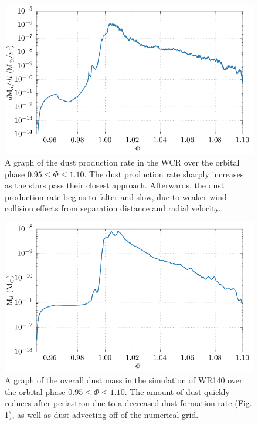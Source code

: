 \documentclass[fleqn,usenatbib]{mnras}
\begin{document}
\begin{figure}
  \centering
  \includegraphics[width=\linewidth]{assets/wr140-dust_rate.pdf}
  \caption{A graph of the dust production rate in the WCR over the orbital phase $0.95 \leq \Phi \leq 1.10$. The dust production rate sharply increases as the stars pass their closest approach. Afterwards, the dust production rate begins to falter and slow, due to weaker wind collision effects from separation distance and radial velocity.}
  \label{fig:wr140-dustproduction}
\end{figure}

\begin{figure}
  \centering
  \includegraphics[width=\linewidth]{assets/wr140-m_dust.pdf}
  \caption{A graph of the overall dust mass in the simulation of WR140 over the orbital phase $0.95 \leq \Phi \leq 1.10$. The amount of dust quickly reduces after periastron due to a decreased dust formation rate (Fig. \ref{fig:wr140-dustproduction}), as well as dust advecting off of the numerical grid.}
  \label{fig:wr140-dustmass}
\end{figure}
\end{document}
